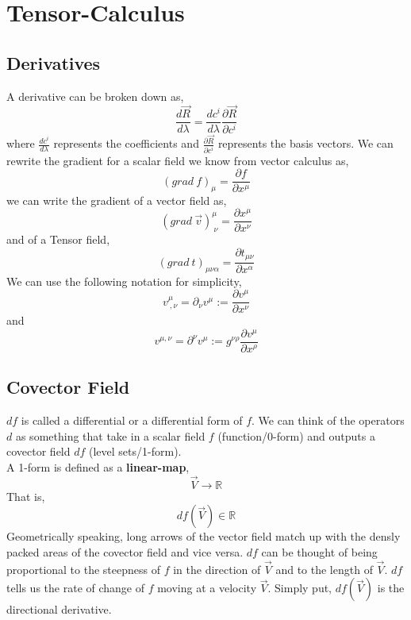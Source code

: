 \chapter{Tensor-Calculus}
\section{Derivatives}
A derivative can be broken down as,
\begin{equation}
\frac{d \vec{R}}{d \lambda} = \frac{d c^{i}}{d \lambda} \frac{\partial \vec{R}}{\partial c^{i}}
\end{equation}
where $\frac{d c^{i}}{d \lambda}$ represents the coefficients and $\frac{\partial \vec{R}}{\partial c^{i}}$ represents the basis vectors.
We can rewrite the gradient for a scalar field we know from vector calculus as, 
\begin{equation}
{(grad \ f)}_{\mu} = \frac{\partial f}{\partial x^{\mu}}
\end{equation}
we can write the gradient of a vector field as,
\begin{equation}
{(grad \ \vec{v})}^{\mu}_{\  \nu} = \frac{\partial x^{\mu}}{\partial x^{\nu}}
\end{equation}
and of a Tensor field,
\begin{equation}
{(grad \ t)}_{\mu \nu \alpha} = \frac{\partial t_{\mu \nu}}{\partial x^{\alpha}}
\end{equation}
We can use the following notation for simplicity,
\begin{equation}
v^{\mu}_{ \ ,\nu} = \partial_{\nu} v^{\mu} := \frac{\partial v^{\mu}}{\partial x^{\nu}}
\end{equation}
and 
\begin{equation}
v^{\mu,\nu} = \partial^{\nu} v^{\mu} := g^{\nu \rho} \frac{\partial v^{\mu}}{\partial x^{\rho}}
\end{equation}
\section{Covector Field}
$df$ is called a differential or a differential form of $f$. We can think of the operators $d$ as something that take in a scalar field $f$ (function/0-form) and outputs a covector field $df$ (level sets/1-form). \\
A 1-form is defined as a \textbf{linear-map},
$$\vec{V} \rightarrow \mathbb{R}$$
That is,
$$df(\vec{V}) \in \mathbb{R}$$
Geometrically speaking, long arrows of the vector field match up with the densly packed areas of the covector field and vice versa. $df$ can be thought of being proportional to the steepness of $f$ in the direction of $\vec{V}$ and to the length of $\vec{V}$. $df$ tells us the rate of change of $f$ moving at a velocity $\vec{V}$. Simply put, $df(\vec{V})$ is the directional derivative.
